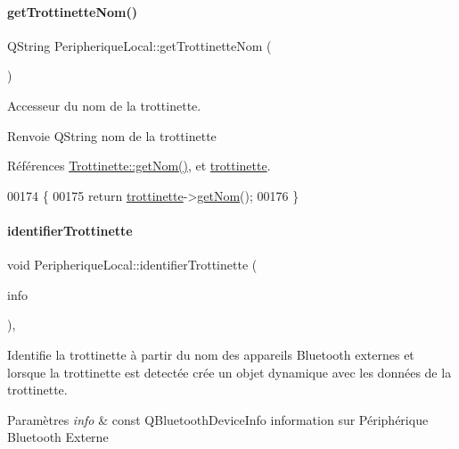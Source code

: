 \paragraph{\texorpdfstring{get\+Trottinette\+Nom()}{getTrottinetteNom()}}
{\footnotesize\ttfamily Q\+String Peripherique\+Local\+::get\+Trottinette\+Nom (\begin{DoxyParamCaption}{ }\end{DoxyParamCaption})}

Accesseur du nom de la trottinette.

\begin{DoxyReturn}{Renvoie}
Q\+String nom de la trottinette 
\end{DoxyReturn}


Références \hyperlink{class_trottinette_a9b191a43bacb534dca0727aedd3076cd}{Trottinette\+::get\+Nom()}, et \hyperlink{class_peripherique_local_aa110b2c3292270553f592362e45f710b}{trottinette}.


\begin{DoxyCode}
00174 \{
00175     \textcolor{keywordflow}{return} \hyperlink{class_peripherique_local_aa110b2c3292270553f592362e45f710b}{trottinette}->\hyperlink{class_trottinette_a9b191a43bacb534dca0727aedd3076cd}{getNom}();
00176 \}
\end{DoxyCode}
\mbox{\label{class_peripherique_local_aab3b5a9b584b0191b9f690add1cfa6ed}} 
\paragraph{\texorpdfstring{identifier\+Trottinette}{identifierTrottinette}}
{\footnotesize\ttfamily void Peripherique\+Local\+::identifier\+Trottinette (\begin{DoxyParamCaption}\item[{const Q\+Bluetooth\+Device\+Info \&}]{info }\end{DoxyParamCaption})\hspace{0.3cm}{\ttfamily [protected]}, {\ttfamily [slot]}}

Identifie la trottinette à partir du nom des appareils Bluetooth externes et lorsque la trottinette est detectée crée un objet dynamique avec les données de la trottinette.


\begin{DoxyParams}{Paramètres}
{\em info} & const Q\+Bluetooth\+Device\+Info information sur Périphérique Bluetooth Externe \\
\hline
\end{DoxyParams}


